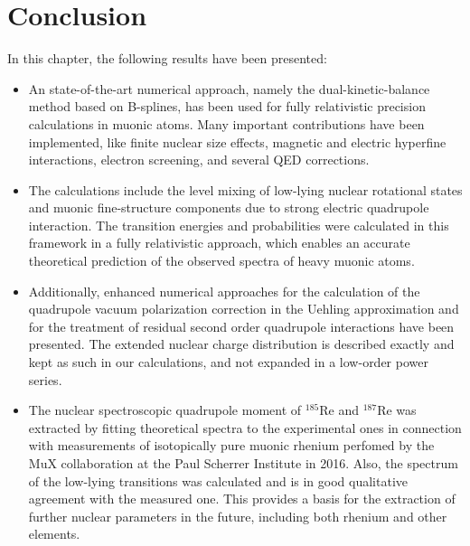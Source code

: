 \section{Conclusion}
\label{sec:muon_summary}
In this chapter, the following results have been presented:\\
\begin{itemize}
\setlength{\itemsep}{0.75cm}
\item An state-of-the-art numerical approach, namely the dual-kinetic-balance method based on B-splines, has been used for fully relativistic precision calculations in muonic atoms. Many important contributions have been implemented, like finite nuclear size effects, magnetic and electric hyperfine interactions, electron screening, and several QED corrections. 

\item The calculations include the level mixing of low-lying nuclear rotational states and muonic fine-structure components due to strong electric quadrupole interaction. The transition energies and probabilities were calculated in this framework in a fully relativistic approach, which enables an accurate theoretical prediction of the observed spectra of heavy muonic atoms.
\item Additionally, enhanced numerical approaches for the calculation of the quadrupole vacuum polarization correction in the Uehling approximation and for the treatment of residual second order quadrupole interactions have been presented. The extended nuclear charge distribution is described exactly and kept as such in our calculations, and not expanded in a low-order power series.
\item The nuclear spectroscopic quadrupole moment of $^{185}$Re and $^{187}$Re was extracted by fitting theoretical spectra to the experimental ones in connection with measurements of isotopically pure muonic rhenium perfomed by the MuX collaboration at the Paul Scherrer Institute in 2016. Also, the spectrum of the low-lying transitions was calculated and is in good qualitative agreement with the measured one. This provides a basis for the extraction of further nuclear parameters in the future, including both rhenium and other elements.
\end{itemize}
